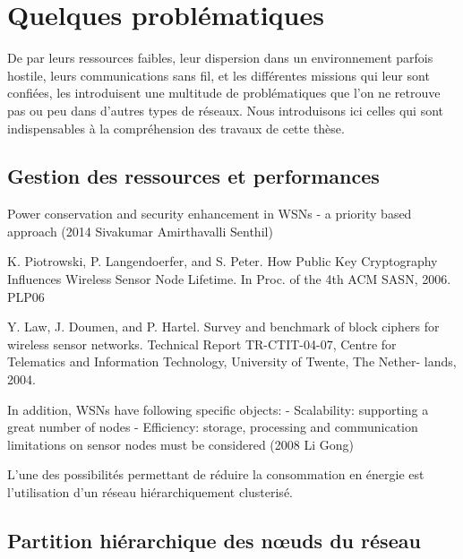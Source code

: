 \section{Quelques problématiques}

De par leurs ressources faibles, leur dispersion dans un environnement parfois hostile, leurs communications sans fil, et les différentes missions qui leur sont confiées, les \rcsfs introduisent une multitude de problématiques que l'on ne retrouve pas ou peu dans d'autres types de réseaux.
Nous introduisons ici celles qui sont indispensables à la compréhension des travaux de cette thèse.

    \subsection{Gestion des ressources et performances}


Power conservation and security enhancement in WSNs - a priority based approach (2014 Sivakumar Amirthavalli Senthil)

K. Piotrowski, P. Langendoerfer, and S. Peter. How Public Key Cryptography Influences Wireless Sensor Node Lifetime. In Proc. of the 4th ACM SASN, 2006.
PLP06

Y. Law, J. Doumen, and P. Hartel. Survey and benchmark of block ciphers for wireless sensor networks. Technical Report TR-CTIT-04-07, Centre for Telematics and Information Technology, University of Twente, The Nether- lands, 2004.


In addition, WSNs have following specific objects:
- Scalability: supporting a great number of nodes
- Efficiency: storage, processing and communication limitations on sensor nodes must be
considered
(2008 Li Gong)


L'une des possibilités permettant de réduire la consommation en énergie est l'utilisation d'un réseau  hiérarchiquement clusterisé.

    \subsection{Partition hiérarchique des nœuds du réseau}%
    \label{st:subsec:partition}

